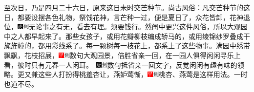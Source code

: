 至次日，乃是四月二十六日，原来这日未时交芒种节。尚古风俗：凡交芒种节的这日，都要设摆各色礼物，祭饯花神，言芒种一过，便是夏日了，众花皆卸，花神退位，{\includegraphics[width=3mm]{../Images/00004}\includegraphics[width=3mm]{../Images/00011}\footnotesize \kaishu 无论事之有无，看去有理。}须要饯行。然闺中更兴这件风俗，所以大观园中之人都早起来了。那些女孩子，或用花瓣柳枝编成轿马的，或用绫锦纱罗叠成干旄旌幢的，都用彩线系了。每一颗树每一枝花上，都系上了这些物事。满园中绣带飘飖，花枝招展，{\includegraphics[width=3mm]{../Images/00002}\includegraphics[width=3mm]{../Images/00011}\footnotesize \kaishu 数句大观园景，倍胜省亲一回，在一园人俱得闲闲寻乐上看，彼时只有元春一人闲耳。　\includegraphics[width=3mm]{../Images/00004}\includegraphics[width=3mm]{../Images/00011}\footnotesize \kaishu 数句抵省亲一回文字，反觉闲闲有趣有味的领略。}更又兼这些人打扮得桃羞杏让，燕妒莺惭，{\includegraphics[width=3mm]{../Images/00002}\includegraphics[width=3mm]{../Images/00011}\footnotesize \kaishu 桃杏、燕莺是这样用法。}一时也道不尽。

